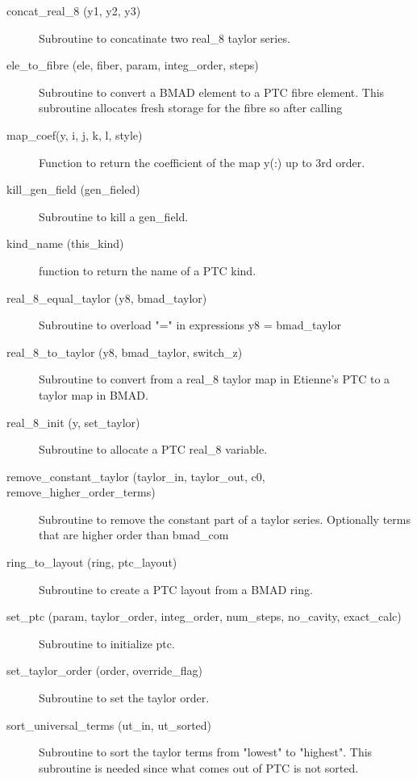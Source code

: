 \begin{description}

\item[concat\_real\_8 (y1, y2, y3)] \Newline
Subroutine to concatinate two real\_8 taylor series. 

\item[ele\_to\_fibre (ele, fiber, param, integ\_order, steps)] \Newline
Subroutine to convert a BMAD element to a PTC fibre element. This subroutine allocates fresh storage for the fibre so after calling 

\item[map\_coef(y, i, j, k, l, style)] \Newline
Function to return the coefficient of the map y(:) up to 3rd order. 

\item[kill\_gen\_field (gen\_fieled)] \Newline
Subroutine to kill a gen\_field. 

\item[kind\_name (this\_kind)] \Newline
function to return the name of a PTC kind. 

\item[real\_8\_equal\_taylor (y8, bmad\_taylor)] \Newline
Subroutine to overload "=" in expressions y8 = bmad\_taylor 

\item[real\_8\_to\_taylor (y8, bmad\_taylor, switch\_z)] \Newline
Subroutine to convert from a real\_8 taylor map in Etienne's PTC to a taylor map in BMAD. 

\item[real\_8\_init (y, set\_taylor)] \Newline
Subroutine to allocate a PTC real\_8 variable. 

\item[remove\_constant\_taylor (taylor\_in, taylor\_out, c0, remove\_higher\_order\_terms)] \Newline
Subroutine to remove the constant part of a taylor series. Optionally terms that are higher order than bmad\_com%

\item[ring\_to\_layout (ring, ptc\_layout)] \Newline
Subroutine to create a PTC layout from a BMAD ring. 

\item[set\_ptc (param, taylor\_order, integ\_order, num\_steps, no\_cavity, exact\_calc)] \Newline
Subroutine to initialize ptc. 

\item[set\_taylor\_order (order, override\_flag)] \Newline
Subroutine to set the taylor order. 

\item[sort\_universal\_terms (ut\_in, ut\_sorted)] \Newline
Subroutine to sort the taylor terms from "lowest" to "highest". This subroutine is needed since what comes out of PTC is not sorted. 


\end{description}
